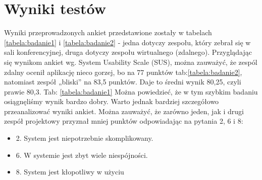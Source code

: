 \section{Wyniki testów}
Wyniki przeprowadzonych ankiet przedstawione zostały w tabelach \ref{tabela:badanie1} i \ref{tabela:badanie2} - jedna dotyczy zespołu,
który zebrał się w sali konferencyjnej, druga dotyczy zespołu wirtualnego (zdalnego).
Przyglądając się wynikom ankiet wg. System Usability Scale (SUS), można zauważyć, że zespól zdalny
ocenił aplikację nieco gorzej, bo na 77 punktów tab:\ref{tabela:badanie2}, natomiast zespół „bliski” na 83,5 punktów. Daje to
średni wynik 80,25, czyli prawie 80,3. Tab: \ref{tabela:badanie1}
Można powiedzieć, że w tym szybkim badaniu osiągnęliśmy wynik bardzo dobry. Warto jednak
bardziej szczegółowo przeanalizować wyniki ankiet. Można zauważyć, że zarówno jeden, jak i drugi
zespół projektowy przyznał mniej punktów odpowiadając na pytania 2, 6 i 8:
\begin{itemize}
    \item 2. System jest niepotrzebnie skomplikowany.
    \item 6. W systemie jest zbyt wiele niespójności.
    \item 8. System jest kłopotliwy w użyciu
\end{itemize}
